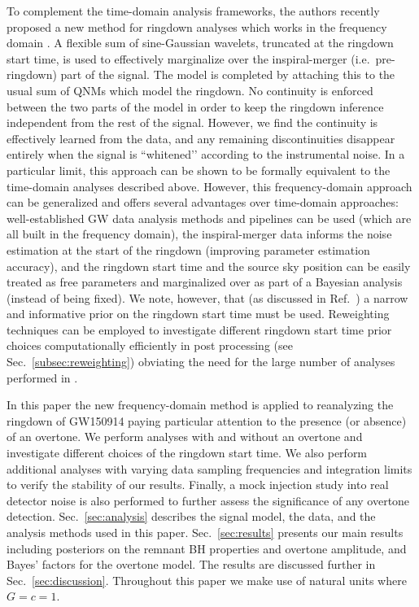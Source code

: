 To complement the time-domain analysis frameworks, the authors recently proposed a new method for ringdown analyses which works in the frequency domain \cite{Finch:2021qph}.
A flexible sum of sine-Gaussian wavelets, truncated at the ringdown start time, is used to effectively marginalize over the inspiral-merger (i.e.\ pre-ringdown) part of the signal.
The model is completed by attaching this to the usual sum of QNMs which model the ringdown.
No continuity is enforced between the two parts of the model in order to keep the ringdown inference independent from the rest of the signal.
However, we find the continuity is effectively learned from the data, and any remaining discontinuities disappear entirely when the signal is ``whitened’’ according to the instrumental noise.
In a particular limit, this approach can be shown to be formally equivalent to the time-domain analyses described above.
However, this frequency-domain approach can be generalized and offers several advantages over time-domain approaches:
well-established GW data analysis methods and pipelines can be used (which are all built in the frequency domain), 
the inspiral-merger data informs the noise estimation at the start of the ringdown (improving parameter estimation accuracy), 
and the ringdown start time and the source sky position can be easily treated as free parameters and marginalized over as part of a Bayesian analysis (instead of being fixed).
We note, however, that (as discussed in Ref.~\cite{Finch:2021qph}) a narrow and informative prior on the ringdown start time must be used.
Reweighting techniques can be employed to investigate different ringdown start time prior choices computationally efficiently in post processing (see Sec.~\ref{subsec:reweighting}) obviating the need for the large number of analyses performed in \cite{Cotesta:2022pci, Isi:2022mhy}.

In this paper the new frequency-domain method is applied to reanalyzing the ringdown of GW150914 paying particular attention to the presence (or absence) of an overtone. 
We perform analyses with and without an overtone and investigate different choices of the ringdown start time. 
We also perform additional analyses with varying data sampling frequencies and integration limits to verify the stability of our results. Finally, a mock injection study into real detector noise is also performed to further assess the significance of any overtone detection.
Sec.~\ref{sec:analysis} describes the signal model, the data, and the analysis methods used in this paper.
Sec.~\ref{sec:results} presents our main results including posteriors on the remnant BH properties and overtone amplitude, and Bayes' factors for the overtone model.
The results are discussed further in Sec.~\ref{sec:discussion}.
Throughout this paper we make use of natural units where $G=c=1$.

